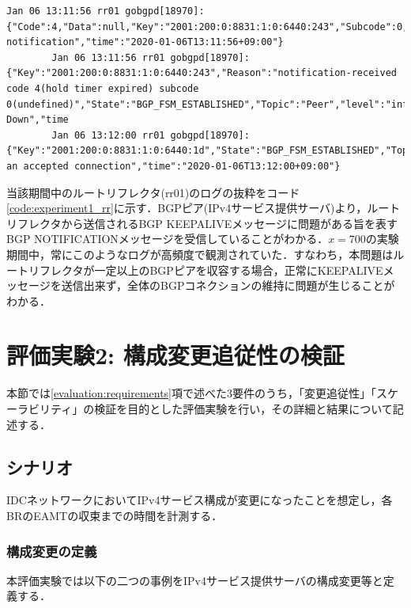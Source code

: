 \begin{minipage}{\textwidth}
    \begin{lstlisting}[caption=EAMTが収束しない時点のルートリフレクタのログの抜粋,label=code:experiment1_rr]
        Jan 06 13:11:56 rr01 gobgpd[18970]: {"Code":4,"Data":null,"Key":"2001:200:0:8831:1:0:6440:243","Subcode":0,"Topic":"Peer","level":"warning","msg":"received notification","time":"2020-01-06T13:11:56+09:00"}
        Jan 06 13:11:56 rr01 gobgpd[18970]: {"Key":"2001:200:0:8831:1:0:6440:243","Reason":"notification-received code 4(hold timer expired) subcode 0(undefined)","State":"BGP_FSM_ESTABLISHED","Topic":"Peer","level":"info","msg":"Peer Down","time
        Jan 06 13:12:00 rr01 gobgpd[18970]: {"Key":"2001:200:0:8831:1:0:6440:1d","State":"BGP_FSM_ESTABLISHED","Topic":"Peer","level":"warning","msg":"Closed an accepted connection","time":"2020-01-06T13:12:00+09:00"}
    \end{lstlisting}
\end{minipage}
    
    
当該期間中のルートリフレクタ(rr01)のログの抜粋をコード\ref{code:experiment1_rr}に示す．BGPピア(IPv4サービス提供サーバ)より，ルートリフレクタから送信されるBGP KEEPALIVEメッセージに問題がある旨を表すBGP NOTIFICATIONメッセージを受信していることがわかる．$x=700$の実験期間中，常にこのようなログが高頻度で観測されていた．すなわち，本問題はルートリフレクタが一定以上のBGPピアを収容する場合，正常にKEEPALIVEメッセージを送信出来ず，全体のBGPコネクションの維持に問題が生じることがわかる．







\section{評価実験2: 構成変更追従性の検証}
\label{evaluation:eval2}
本節では\ref{evaluation:requirements}項で述べた3要件のうち，「変更追従性」「スケーラビリティ」の検証を目的とした評価実験を行い，その詳細と結果について記述する．



\subsection{シナリオ}
IDCネットワークにおいてIPv4サービス構成が変更になったことを想定し，各BRのEAMTの収束までの時間を計測する．

\subsubsection{構成変更の定義}
\label{evaluation:eval2:scenario:definication}
本評価実験では以下の二つの事例をIPv4サービス提供サーバの構成変更等と定義する．

